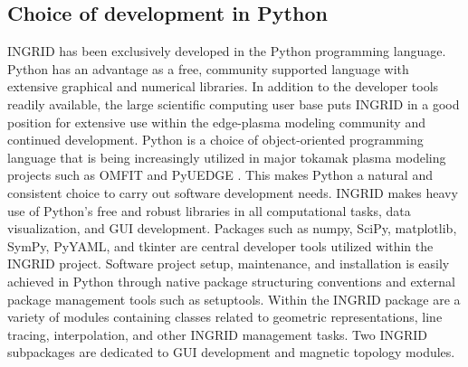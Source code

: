 \subsection{\label{sec:level2}Choice of development in Python}

INGRID has been exclusively developed in the Python programming
language. Python has an advantage as a free, community supported
language with extensive graphical and numerical libraries. In addition
to the developer tools readily available, the large scientific
computing user base puts INGRID in a good position for extensive use
within the edge-plasma modeling community and continued
development. Python is a choice of object-oriented programming
language that is being increasingly utilized in major tokamak plasma
modeling projects such as OMFIT \cite{Meneghini_2015,
  Orso_MENEGHINI2013} and PyUEDGE \cite{PyUEDGE}. This makes Python a
natural and consistent choice to carry out software development
needs. INGRID makes heavy use of Python's free and robust libraries in
all computational tasks, data visualization, and GUI
development. Packages such as numpy, SciPy, matplotlib, SymPy, PyYAML,
and tkinter are central developer tools utilized within the INGRID
project\cite{numpy_5725236, virtanen2019scipy,
  matplotlib_4160265, PyYAML}. Software project setup, maintenance, and
installation is easily achieved in Python through native package
structuring conventions and external package management tools such as
setuptools.  Within the INGRID package are a variety of modules
containing classes related to geometric representations, line tracing,
interpolation, and other INGRID management tasks. Two INGRID
subpackages are dedicated to GUI development and magnetic topology
modules.

